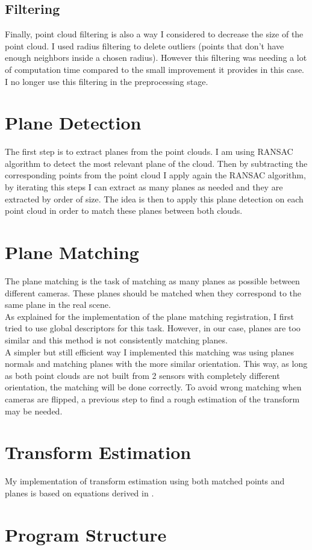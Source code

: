 \subsection{Filtering}

Finally, point cloud filtering is also a way I considered to decrease the size of the point cloud. I used radius filtering to delete outliers (points that don’t have enough neighbors inside a chosen radius). However this filtering was needing a lot of computation time compared to the small improvement it provides in this case. I no longer use this filtering in the preprocessing stage. 

\section{Plane Detection}

The first step is to extract planes from the point clouds. I am using RANSAC algorithm to detect the most relevant plane of the cloud. Then by subtracting the corresponding points from the point cloud I apply again the RANSAC algorithm, by iterating this steps I can extract as many planes as needed and they are extracted by order of size. The idea is then to apply this plane detection on each point cloud in order to match these planes between both clouds. 

\section{Plane Matching}

The plane matching is the task of matching as many planes as possible between different cameras. These planes should be matched when they correspond to the same plane in the real scene. \\
As explained for the implementation of the plane matching registration, I first tried to use global descriptors for this task. However, in our case, planes are too similar and this method is not consistently matching planes. \\
A simpler but still efficient way I implemented this matching was using planes normals and matching planes with the more similar orientation. This way, as long as both point clouds are not built from 2 sensors with completely different orientation, the matching will be done correctly. To avoid wrong matching when cameras are flipped, a previous step to find a rough estimation of the transform may be needed.

\section{Transform Estimation}

My implementation of transform estimation using both matched points and planes is based on equations derived in \cite{ytaguchi2013}.

\section{Program Structure}